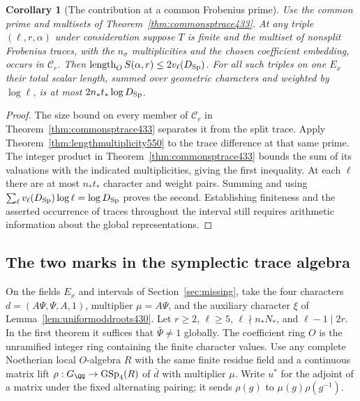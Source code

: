 \documentclass[a4paper,11pt]{article}
\newtheorem{corollary}[proposition]{Corollary}
\theoremstyle{definition}
\theoremstyle{remark}
\numberwithin{equation}{section}
\begin{document}
\begin{corollary}[The contribution at a common Frobenius prime]
\leavevmode\label{cor:intervalmultiplicity550}
Use the common prime and multisets of Theorem~\ref{thm:commonsptrace433}.
At any triple \((\ell,r,\alpha)\) under consideration suppose
\(T\) is finite and the multiset of nonsplit Frobenius traces,
with the \(n_\sigma\) multiplicities and the chosen coefficient
embedding, occurs in \(\mathcal C_r\). Then
\(\operatorname{length}_O S(\alpha,r)\le2v_\ell(D_{\rm Sp})\).
For all such triples on one \(E_x\) their total scalar length,
summed over geometric characters and weighted by \(\log\ell\),
is at most \(2n_*t_*\log D_{\rm Sp}\).
\end{corollary}
\begin{proof}
The size bound on every member of \(\mathcal C_r\) in
Theorem~\ref{thm:commonsptrace433} separates it from the split
trace. Apply Theorem~\ref{thm:lengthmultiplicity550} to the
trace difference at that same prime. The integer product in
Theorem~\ref{thm:commonsptrace433} bounds the sum of its
valuations with the indicated multiplicities, giving the first
inequality. At each \(\ell\) there are at most \(n_*t_*\)
character and weight pairs. Summing and using
\(\sum_\ell v_\ell(D_{\rm Sp})\log\ell=\log D_{\rm Sp}\) proves
the second. Establishing finiteness and the asserted occurrence
of traces throughout the interval still requires arithmetic
information about the global representations.
\end{proof}


\subsection{The two marks in the symplectic trace algebra}
\label{sec:twomarks557}

On the fields \(E_x\) and intervals of Section~\ref{sec:missing},
take the four characters \(d=(A\Psi,\Psi,A,1)\), multiplier
\(\mu=A\Psi\), and the auxiliary character \(\xi\) of
Lemma~\ref{lem:uniformoddroots430}. Let \(r\ge2\),
\(\ell\ge5\), \(\ell\nmid n_*N_*\), and \(\ell-1\mid 2r\).
In the first theorem it suffices that \(\bar\Psi\ne1\) globally.
The coefficient ring \(O\) is the unramified integer ring
containing the finite character values. Use any complete
Noetherian local \(O\)-algebra \(R\) with the same finite
residue field and a continuous matrix lift
\(\rho:G_{\QQ}\to\operatorname{GSp}_4(R)\) of \(\bar d\) with
multiplier \(\mu\). Write \(u^*\) for the adjoint of a matrix
under the fixed alternating pairing; it sends \(\rho(g)\) to
\(\mu(g)\rho(g^{-1})\).
\end{document}
